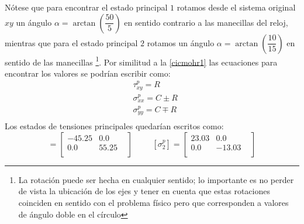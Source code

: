 \documentclass[../notas medios.tex]{subfiles}
\begin{document}
\begin{enumerate}
Nótese que para encontrar el estado principal $1$ rotamos desde el sistema
original $xy$ un ángulo $\alpha = \arctan\left(\dfrac{50}{5}\right)$ en sentido
contrario a las manecillas del reloj, mientras que para el estado principal $2$
rotamos un ángulo $\alpha = \arctan\left(\dfrac{10}{15}\right)$ en sentido de
las manecillas \footnote{La rotación puede ser hecha en cualquier sentido; lo
importante es no perder de vista la ubicación de los ejes y tener en cuenta
que estas rotaciones coinciden en sentido con el problema físico pero que
corresponden a valores de ángulo doble en el círculo}.
Por similitud a la  \cref{cicmohr1} las ecuaciones para encontrar los valores se podrían escribir como:\\
%
\begin {equation}
\begin {aligned}
&\tau^p_{xy} = R \\
&\sigma^p_{xx} = C \pm R \\
&\sigma^p_{yy} = C \mp R  \\
\end {aligned}
\label{cicmohr2}
\end {equation}
%
Los estados de tensiones principales quedarían escritos como:\\
%
 \begin{equation}
[\sigma^p_{1}] =
 	\begin{bmatrix}
     	-45.25 & 0.0 &  \\
     	0.0 & 55.25 \\
 	\end{bmatrix}
 \hspace{1cm}
 [\sigma^p_{2}] =
 	\begin{bmatrix}
     	23.03 & 0.0 &  \\
     	0.0 & -13.03 \\
 	\end{bmatrix}
\end{equation}
%


\end{enumerate}
\end{document}
